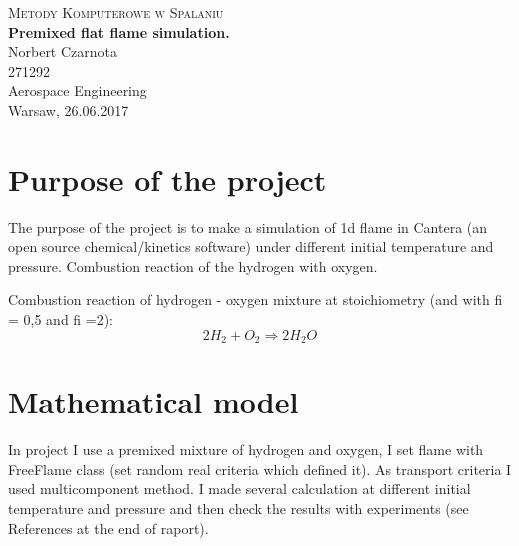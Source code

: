 \documentclass[11pt]{article}
\begin{document}
\begin{titlepage}

	\begin{center}

    


	\huge{\textsc{Metody Komputerowe w Spalaniu}} \\
[50mm]

    \LARGE{\textbf{Premixed flat flame simulation.
}} \\
	[50mm]
	\Large{Norbert Czarnota}\\
    \Large{271292}\\
    [25mm]
    \large{Aerospace Engineering}\\
    [80mm]
    \large{Warsaw, 26.06.2017}\\
    \end{center}
    
\end{titlepage}

\newpage



\section{Purpose of the project}
The purpose of the project is to make a simulation of 1d flame in Cantera (an open source chemical/kinetics software) under different initial temperature and pressure. 
Combustion reaction of the hydrogen with oxygen.



Combustion reaction of hydrogen - oxygen mixture at stoichiometry (and with fi = 0,5 and fi =2):
\begin{displaymath}
2 H_{2} + O_{2}  \Rightarrow  2 H_{2}O 
\end{displaymath}

\section{Mathematical model}
In project I use a premixed mixture of hydrogen and oxygen, I set flame with FreeFlame class (set random real criteria which defined it). As transport criteria I used multicomponent method. I made several calculation at different initial temperature and pressure and then check the results with experiments (see References at the end of raport).
\end{document}
